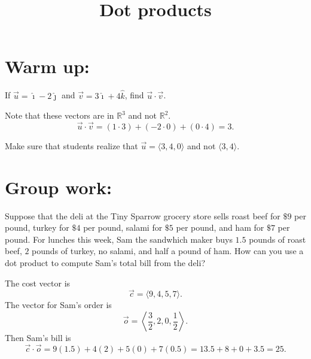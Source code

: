 \documentclass[]{ximera}
\title{Dot products}
\begin{document}
\begin{abstract}		\end{abstract}
\maketitle



\section{Warm up:}
If $\vec{u} = \hat{\imath} - 2 \hat{\jmath}$ and $\vec{v} = 3 \hat{\imath} + 4 \hat{k}$, find $\vec{u} \cdot \vec{v}$.
	\begin{freeResponse}
	Note that these vectors are in $\mathbb{R}^3$ and not $\mathbb{R}^2$.
	\[
	\vec{u} \cdot \vec{v} = (1 \cdot 3) + (-2 \cdot 0) + (0 \cdot 4) = \boxed{3}.
	\]
	\end{freeResponse}
	
\begin{instructorNotes}
Make sure that students realize that $\vec{u} = \langle 3,4,0 \rangle$ and not $\langle 3,4 \rangle$.
\end{instructorNotes}







\section{Group work:}



\begin{problem}
Suppose that the deli at the Tiny Sparrow grocery store sells roast beef for $ \$ 9$ per pound, turkey for $ \$ 4$ per pound, salami for $\$ 5$ per pound, and ham for $\$ 7$ per pound.  
For lunches this week, Sam the sandwhich maker buys $1.5$ pounds of roast beef, $2$ pounds of turkey, no salami, and half a pound of ham.  
How can you use a dot product to compute Sam's total bill from the deli?
	\begin{freeResponse}
	The cost vector is
		\[
		\vec{c} = \langle 9,4,5,7 \rangle.
		\]
	The vector for Sam's order is
		\[
		\vec{o} = \left\langle \frac{3}{2}, 2, 0, \frac{1}{2} \right\rangle.
		\]
	Then Sam's bill is
		\[
		\vec{c} \cdot \vec{o} = 9(1.5) + 4(2) + 5(0) + 7(0.5) = 13.5 + 8 + 0 + 3.5 = \boxed{25}.
		\]
	\end{freeResponse}
	
\end{problem}
\end{document}
